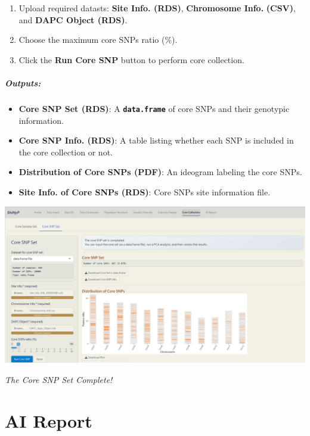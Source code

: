 \documentclass[
]{book}
\begin{document}
\begin{enumerate}
\def\labelenumi{\arabic{enumi}.}
\item
  {Upload} required datasts: \textbf{Site Info. (RDS)}, \textbf{Chromosome Info.} \textbf{(CSV)}, and \textbf{DAPC Object (RDS)}.
\item
  Choose the maximum core SNPs ratio (\%).
\item
  Click the {\textbf{Run Core SNP}} button to perform core collection.
\end{enumerate}

\paragraph*{Outputs:}\label{outputs-21}

\begin{itemize}
\item
  \textbf{Core SNP Set (RDS)}: A {\textbf{\texttt{data.frame}}} of core SNPs and their genotypic information.
\item
  \textbf{Core SNP Info. (RDS)}: A table listing whether each SNP is included in the core collection or not.
\item
  \textbf{Distribution of Core SNPs (PDF)}: An ideogram labeling the core SNPs.
\item
  \textbf{Site Info. of Core SNPs (RDS)}: Core SNPs site information file.
\end{itemize}

\includegraphics{images/clipboard-1144175211.png}

\emph{The Core SNP Set Complete!}

\chapter{AI Report}\label{sec-ai-report}
\end{document}
